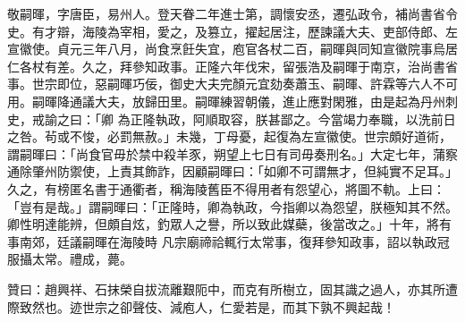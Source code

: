 \begin{pinyinscope}
 敬嗣暉，字唐臣，易州人。登天眷二年進士第，調懷安丞，遷弘政令，補尚書省令史。有才辯，海陵為宰相，愛之，及篡立，擢起居注，歷諫議大夫、吏部侍郎、左宣徽使。貞元三年八月，尚食烹飪失宜，庖官各杖二百，嗣暉與同知宣徽院事烏居仁各杖有差。久之，拜參知政事。正隆六年伐宋，留張浩及嗣暉于南京，治尚書省事。世宗即位，惡嗣暉巧佞，御史大夫完顏元宜劾奏蕭玉、嗣暉、許霖等六人不可用。嗣暉降通議大夫，放歸田里。嗣暉練習朝儀，進止應對閑雅，由是起為丹州刺史，戒諭之曰：「卿
 為正隆執政，阿順取容，朕甚鄙之。今當竭力奉職，以洗前日之咎。茍或不悛，必罰無赦。」未幾，丁母憂，起復為左宣徽使。世宗頗好道術，謂嗣暉曰：「尚食官毋於禁中殺羊豕，朔望上七日有司毋奏刑名。」大定七年，蒲察通除肇州防禦使，上責其飾詐，因顧嗣暉曰：「如卿不可謂無才，但純實不足耳。」久之，有榜匿名書于通衢者，稱海陵舊臣不得用者有怨望心，將圖不軌。上曰：「豈有是哉。」謂嗣暉曰：「正隆時，卿為執政，今指卿以為怨望，朕極知其不然。卿性明達能辨，但頗自炫，釣眾人之譽，所以致此媒蘗，後當改之。」十年，將有事南郊，廷議嗣暉在海陵時
 凡宗廟禘祫輒行太常事，復拜參知政事，詔以執政冠服攝太常。禮成，薨。



 贊曰：趙興祥、石抹榮自拔流離艱阨中，而克有所樹立，固其識之過人，亦其所遭際致然也。迹世宗之卻聲伎、減庖人，仁愛若是，而其下孰不興起哉！



\end{pinyinscope}